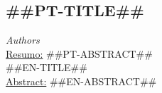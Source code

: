 \subsection*{##PT-TITLE##}
\vspace{-0.2cm}
\noindent
\textit{Authors}\\[0.2cm]
\underline{Resumo:} ##PT-ABSTRACT##\\[0.5cm]
{\large ##EN-TITLE##}\\[0.2cm]
\underline{Abstract:} ##EN-ABSTRACT##
